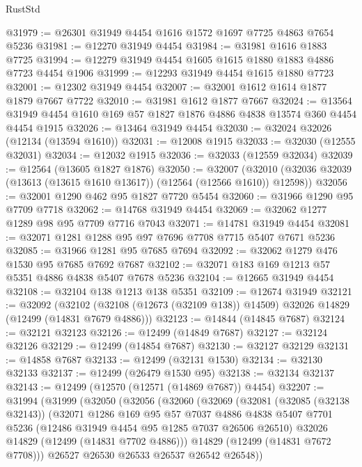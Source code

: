 \begin{lexlean}{RustStd}
\begin{coremodule}
{\begin{coremodule}
{{{{{{{{{{{{{{{{{{{{{{{{{{{{{{{{{{{{{{{{{{{{{{{{{{{{{{{{{{{{{{{{{{{{{{{{{{{{{{{{@31979 := @26301 @31949 @4454 @1616 @1572 @1697 @7725 @4863 @7654 @5236
@31981 := @12270 @31949 @4454
@31984 := @31981 @1616 @1883 @7725
@31994 := @12279 @31949 @4454 @1605 @1615 @1880 @1883 @4886 @7723 @4454 @1906
@31999 := @12293 @31949 @4454 @1615 @1880 @7723
@32001 := @12302 @31949 @4454
@32007 := @32001 @1612 @1614 @1877 @1879 @7667 @7722
@32010 := @31981 @1612 @1877 @7667
@32024 := @13564 @31949 @4454 @1610 @169 @57 @1827 @1876 @4886 @4838 @13574 @360 @4454 @4454 @1915
@32026 := @13464 @31949 @4454
@32030 := @32024 @32026 (@12134 (@13594 @1610))
@32031 := @12008 @1915
@32033 := @32030 (@12555 @32031)
@32034 := @12032 @1915
@32036 := @32033 (@12559 @32034)
@32039 := @12564 (@13605 @1827 @1876)
@32050 := @32007
    (@32010 (@32036 @32039 (@13613 (@13615 @1610 @13617)) (@12564 (@12566 @1610)) @12598))
@32056 := @32001 @1290 @462 @95 @1827 @7720 @5454
@32060 := @31966 @1290 @95 @7709 @7718
@32062 := @14768 @31949 @4454
@32069 := @32062 @1277 @1289 @98 @95 @7709 @7716 @7043
@32071 := @14781 @31949 @4454
@32081 := @32071 @1281 @1288 @95 @97 @7696 @7708 @7715 @5407 @7671 @5236
@32085 := @31966 @1281 @95 @7685 @7694
@32092 := @32062 @1279 @476 @1530 @95 @7685 @7692 @7687
@32102 := @32071 @183 @169 @1213 @57 @5351 @4886 @4838 @5407 @7678 @5236
@32104 := @12665 @31949 @4454
@32108 := @32104 @138 @1213 @138 @5351
@32109 := @12674 @31949
@32121 := @32092
    (@32102 (@32108 (@12673 (@32109 @138)) @14509) @32026 @14829 (@12499 (@14831 @7679 @4886)))
@32123 := @14844 (@14845 @7687)
@32124 := @32121 @32123
@32126 := @12499 (@14849 @7687)
@32127 := @32124 @32126
@32129 := @12499 (@14854 @7687)
@32130 := @32127 @32129
@32131 := @14858 @7687
@32133 := @12499 (@32131 @1530)
@32134 := @32130 @32133
@32137 := @12499 (@26479 @1530 @95)
@32138 := @32134 @32137
@32143 := @12499 (@12570 (@12571 (@14869 @7687)) @4454)
@32207 := @31994
    (@31999
      (@32050
        (@32056
          (@32060
            (@32069
              (@32081
                (@32085 (@32138 @32143))
                (@32071
                  @1286
                  @169
                  @95
                  @57
                  @7037
                  @4886
                  @4838
                  @5407
                  @7701
                  @5236
                  (@12486 @31949 @4454 @95 @1285 @7037 @26506 @26510)
                  @32026
                  @14829
                  (@12499 (@14831 @7702 @4886)))
                @14829
                (@12499 (@14831 @7672 @7708)))
              @26527
              @26530
              @26533
              @26537
              @26542
              @26548))
}}}}}}}}}}}}}}}}}}}}}}}}}}}}}}}}}}}}}}}}}}}}}}}}}}}}}}}}}}}}}}}}}}}}}}}}}}}}}}}}
\end{coremodule}}
\end{coremodule}
\end{lexlean}

